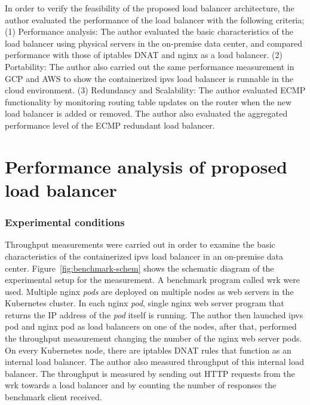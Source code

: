 
In order to verify the feasibility of the proposed load balancer architecture, the author evaluated the performance of the load balancer with the following criteria;
(1) Performance analysis:
The author evaluated the basic characteristics of the load balancer using physical servers in the on-premise data center, and compared performance with those of iptables DNAT and nginx as a load balancer.
(2) Portability:
The author also carried out the same performance measurement in GCP and AWS to show the containerized ipvs load balancer is runnable in the cloud environment.
(3) Redundancy and Scalability:
The author evaluated ECMP functionality by monitoring routing table updates on the router when the new load balancer is added or removed.
The author also evaluated the aggregated performance level of the ECMP redundant load balancer.

\section{Performance analysis of proposed load balancer}

\subsubsection{Experimental conditions}

Throughput measurements were carried out in order to examine the basic characteristics of the containerized ipvs load balancer in an on-premise data center.
Figure~\ref{fig:benchmark-schem} shows the schematic diagram of the experimental setup for the measurement.
A benchmark program called wrk \cite{Glozer2016} were used.
Multiple nginx {\em pods} are deployed on multiple nodes as web servers in the Kubernetes cluster.
In each nginx {\em pod}, single nginx web server program that returns the IP address of the {\em pod} itself is running.
The author then launched ipvs pod and nginx pod as load balancers on one of the nodes, after that, performed the throughput measurement changing the number of the nginx web server pods.
On every Kubernetes node, there are iptables DNAT rules that function as an internal load balancer.
The author also measured throughput of this internal load balancer.
The throughput is measured by sending out HTTP requests from the wrk towards a load balancer and by counting the number of responses the benchmark client received.

